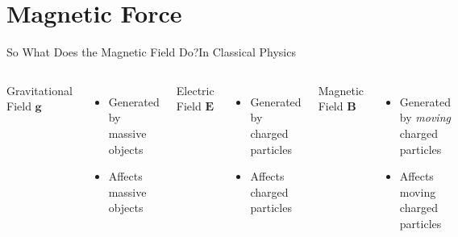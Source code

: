 \documentclass[12pt,aspectratio=169]{beamer}
\newcommand{\mb}[1]{\mathbf{#1}}
\begin{document}
\section{Magnetic Force}

\begin{frame}{So What Does the Magnetic Field Do?}{In Classical Physics}
  \begin{columns}
    \begin{center}
      Gravitational Field $\mb{g}$
    \end{center}
    \begin{itemize}
    \item Generated by massive objects
    \item Affects massive objects
    \end{itemize}

    \begin{center}
      Electric Field $\mb{E}$
    \end{center}
    \begin{itemize}
    \item Generated by charged particles
    \item Affects charged particles
    \end{itemize}

    \begin{center}
      Magnetic Field $\mb{B}$
    \end{center}
    \begin{itemize}
    \item Generated by \emph{moving} charged particles
    \item Affects moving charged particles
    \end{itemize}
  \end{columns}
\end{frame}
\end{document}

